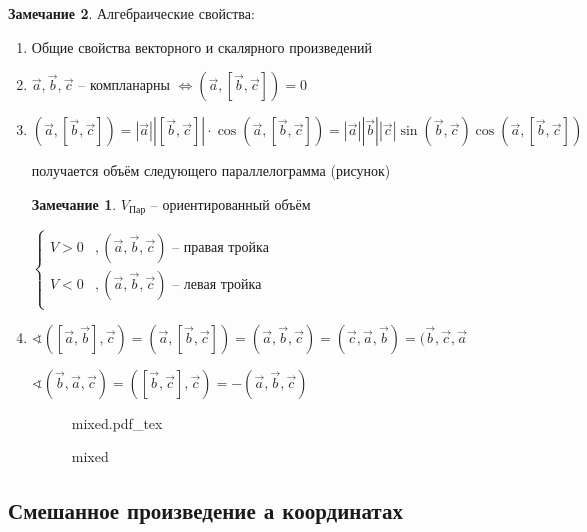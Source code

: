 \documentclass{book}
\theoremstyle{definition}
\newtheorem*{note}{Замечание}
\newcommand{\incfig}[1]{%
    \def\svgwidth{\columnwidth}
    {#1.pdf_tex}
}
\begin{document}
\begin{note}
    Алгебраические свойства:
    \begin{enumerate}
        \item Общие свойства векторного и скалярного произведений
        \item $\vec a, \vec b, \vec c$ -- компланарны  $\iff (\vec a, [\vec b, \vec c]) = 0$
        \item $\left( \vec a, \left[ \vec b, \vec c \right]  \right)  = \left| \vec a \right| \left| \left[ \vec b, \vec c \right]  \right|\cdot \cos \left( \vec a, [\vec b , \vec c] \right)  = \left| \vec a \right| \left| \vec b \right| \left| \vec c \right|  \sin (\vec b, \vec c)\cos \left( \vec a, \left[ \vec b, \vec c \right]  \right) $

            получается объём следующего параллелограмма (рисунок)
            \begin{note}
                $V_{\text{Пар}}$ -- ориентированный объём 

                $\begin{cases}
                    V>0&,(\vec a, \vec b, \vec c) \text{ -- правая тройка }\\
                    V<0&,(\vec a, \vec b, \vec c) \text{ -- левая тройка }\\
                \end{cases}$
            \end{note}
        \item $\sphericalangle \left( [\vec a, \vec b], \vec c \right) = \left( \vec a, \left[ \vec b, \vec c \right]  \right)  = (\vec a, \vec b, \vec c) = (\vec c, \vec a, \vec b) = (\vec b, \vec c, \vec a $

            $\sphericalangle (\vec b, \vec a, \vec c) = \left( \left[ \vec b, \vec c \right] , \vec c \right) = -\left( \vec a, \vec b, \vec c \right) $
\begin{figure}[ht]
    \centering
    \incfig{mixed}
    \caption{mixed}
    \label{fig:mixed}
\end{figure}
    \end{enumerate}
\end{note}

\subsection{Смешанное произведение а координатах}
\end{document}
